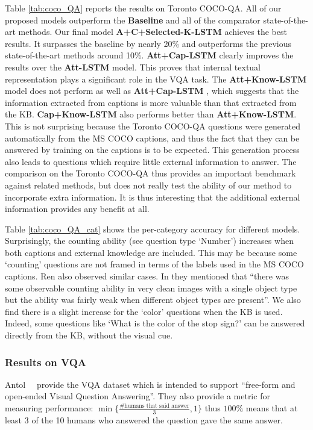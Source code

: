 Table \ref{tab:coco_QA} reports the results on Toronto COCO-QA. All of our proposed models outperform the \textbf{Baseline} and all of the comparator state-of-the-art methods. Our final model \textbf{A+C+Selected-K-LSTM} achieves the best results. It surpasses the baseline by nearly 20\% and outperforms the previous state-of-the-art methods around 10\%. \textbf{Att+Cap-LSTM} clearly improves the results over the \textbf{Att-LSTM} model. This proves that internal textual representation plays a significant role in the VQA task. The \textbf{Att+Know-LSTM} model does not perform as well as \textbf{Att+Cap-LSTM} , which suggests that the information extracted from captions is more valuable than that extracted from the KB.  \textbf{Cap+Know-LSTM} also performs better than \textbf{Att+Know-LSTM}. This is not surprising because the Toronto COCO-QA questions were generated automatically from the MS COCO captions, and thus the fact that they can be answered by training on the captions is to be expected.  This generation process also leads to questions which require little external information to answer. The comparison on the Toronto COCO-QA thus provides an important benchmark against related methods, but does not really test the ability of our method to incorporate extra information.  It is thus interesting that the additional external information provides any benefit at all.

Table \ref{tab:coco_QA_cat} shows the per-category accuracy for different models. Surprisingly, the counting ability (see question type `Number') increases when both captions and external knowledge are included. This may be because some `counting' questions are not framed in terms of the labels used in the MS COCO captions. Ren \etal also observed similar cases. In \cite{ren2015image} they mentioned that ``there was some observable counting ability in very clean images with a single object type but the ability was fairly weak when different object types are present''. We also find there is a slight increase for the `color' questions when the KB is used. Indeed, some questions like `What is the color of the stop sign?' can be answered directly from the KB, without the visual cue. 

\subsubsection{Results on VQA}
Antol~\etal~\cite{antol2015vqa} provide the VQA dataset which is intended to support ``free-form and open-ended Visual Question Answering''. They also provide a metric for measuring performance: $\min\{\frac{\text{\# humans that said answer}}{3},1\}$ thus $100\%$ means that at least 3 of the 10 humans who answered the question gave the same answer. %

